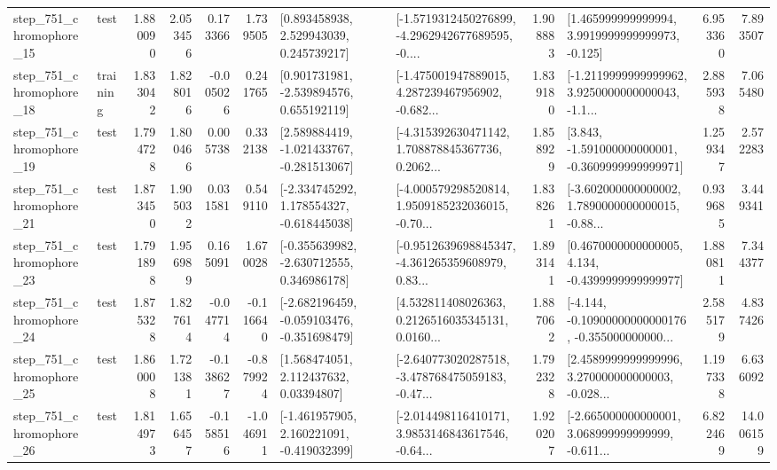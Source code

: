 \begin{tabular}{llrrrrllrlrr}
  step\_751\_chromophore\_15 &      test &      1.880090 &    2.053456 &      0.173366 &  1.739505 &     [0.893458938, 2.529943039, 0.245739217] &  [-1.5719312450276899, -4.2962942677689595, -0.... &       1.908883 &    [1.465999999999994, 3.9919999999999973, -0.125] &            6.953360 &          7.893507 \\
  step\_751\_chromophore\_18 &  training &      1.833042 &    1.828016 &     -0.005026 &  0.241765 &    [0.901731981, -2.539894576, 0.655192119] &  [-1.475001947889015, 4.287239467956902, -0.682... &       1.839180 &  [-1.2119999999999962, 3.9250000000000043, -1.1... &            2.885938 &          7.065480 \\
  step\_751\_chromophore\_19 &      test &      1.794728 &    1.800466 &      0.005738 &  0.332138 &   [2.589884419, -1.021433767, -0.281513067] &  [-4.315392630471142, 1.708878845367736, 0.2062... &       1.858929 &   [3.843, -1.591000000000001, -0.3609999999999971] &            1.259347 &          2.572283 \\
  step\_751\_chromophore\_21 &      test &      1.873450 &    1.905032 &      0.031581 &  0.549110 &   [-2.334745292, 1.178554327, -0.618445038] &  [-4.000579298520814, 1.9509185232036015, -0.70... &       1.838261 &  [-3.602000000000002, 1.7890000000000015, -0.88... &            0.939685 &          3.449341 \\
  step\_751\_chromophore\_23 &      test &      1.791898 &    1.956989 &      0.165091 &  1.670028 &   [-0.355639982, -2.630712555, 0.346986178] &  [-0.9512639698845347, -4.361265359608979, 0.83... &       1.893141 &   [0.4670000000000005, 4.134, -0.4399999999999977] &            1.880811 &          7.344377 \\
  step\_751\_chromophore\_24 &      test &      1.875328 &    1.827614 &     -0.047714 & -0.116640 &  [-2.682196459, -0.059103476, -0.351698479] &  [4.532811408026363, 0.2126516035345131, 0.0160... &       1.887062 &  [-4.144, -0.10900000000000176, -0.355000000000... &            2.585179 &          4.837426 \\
  step\_751\_chromophore\_25 &      test &      1.860008 &    1.721381 &     -0.138627 & -0.879924 &      [1.568474051, 2.112437632, 0.03394807] &  [-2.640773020287518, -3.478768475059183, -0.47... &       1.792328 &  [2.4589999999999996, 3.270000000000003, -0.028... &            1.197338 &          6.636092 \\
  step\_751\_chromophore\_26 &      test &      1.814973 &    1.656457 &     -0.158516 & -1.046911 &   [-1.461957905, 2.160221091, -0.419032399] &  [-2.014498116410171, 3.9853146843617546, -0.64... &       1.920207 &  [-2.665000000000001, 3.068999999999999, -0.611... &            6.822469 &         14.006159 \\

\end{tabular}
